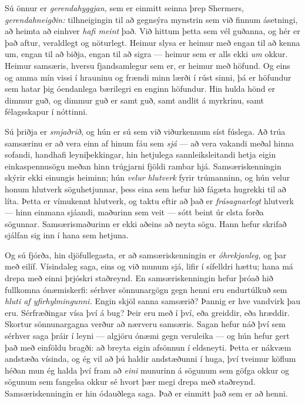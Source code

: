 Sú önnur er \emph{gerendahyggjan,} sem er einmitt seinna þrep Shermers, \emph{gerendahneigðin:} tilhneigingin til að gegnsýra mynstrin sem við finnum ásetningi, að heimta að einhver \emph{hafi meint} það. Við hittum þetta sem vél guðanna, og hér er það aftur, veraldlegt og nöturlegt. Heimur slysa er heimur með engan til að kenna um, engan til að biðja, engan til að sigra — heimur sem er alls ekki \emph{um} okkur. Heimur samsæris, hversu fjandsamlegur sem er, er heimur með höfund. Og eins og amma mín vissi í hrauninu og frændi minn lærði í rúst sinni, þá er höfundur sem hatar þig óendanlega bærilegri en enginn höfundur. Hin hulda hönd er dimmur guð, og dimmur guð er samt guð, samt andlit á myrkrinu, samt félagsskapur í nóttinni.

Sú þriðja er \emph{smjaðrið,} og hún er sú sem við viðurkennum síst fúslega. Að trúa samsærinu er að vera einn af hinum fáu sem \emph{sjá} — að vera vakandi meðal hinna sofandi, handhafi leyniþekkingar, hin hetjulega sannleiksleitandi hetja eigin einkaspennusögu meðan hinn trúgjarni fjöldi rambar hjá. Samsæriskenningin skýrir ekki einungis heiminn; hún \emph{velur hlutverk} fyrir trúmanninn, og hún velur honum hlutverk söguhetjunnar, þess eina sem hefur hið fágæta hugrekki til að líta. Þetta er vímukennt hlutverk, og taktu eftir að það er \emph{frásagnarlegt} hlutverk — hinn einmana sjáandi, maðurinn sem veit — sótt beint úr elsta forða sögunnar. Samsærismaðurinn er ekki aðeins að neyta sögu. Hann hefur skrifað sjálfan sig inn í hana sem hetjuna.

Og sú fjórða, hin djöfullegasta, er að samsæriskenningin er \emph{óhrekjanleg,} og þar með eilíf. Vísindaleg saga, eins og við munum sjá, lifir í sífelldri hættu; hana má drepa með einni þrjóskri staðreynd. En samsæriskenningin hefur þróað hið fullkomna ónæmiskerfi: sérhver sönnunargögn gegn henni eru endurtúlkuð sem \emph{hluti af yfirhylmingunni.} Engin skjöl sanna samsærið? Þannig er hve vandvirk þau eru. Sérfræðingar vísa því á bug? Þeir eru með í því, eða greiddir, eða hræddir. Skortur sönnunargagna verður að nærveru samsæris. Sagan hefur náð því sem sérhver saga þráir í leyni — algjöru ónæmi gegn veruleika — og hún hefur gert það með einföldu bragði: að breyta eigin afsönnun í eldsneyti. Þetta er nákvæm andstæða vísinda, og ég vil að þú haldir andstæðunni í huga, því tveimur köflum héðan mun ég halda því fram að \emph{eini} munurinn á sögunum sem göfga okkur og sögunum sem fangelsa okkur sé hvort þær megi drepa með staðreynd. Samsæriskenningin er hin ódauðlega saga. Það er einmitt það sem er að henni.

